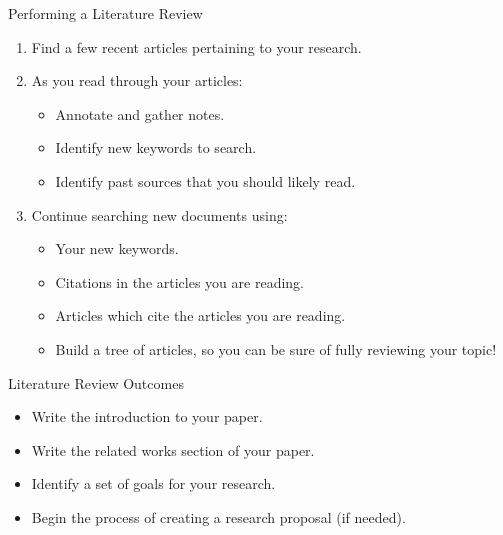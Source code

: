 \documentclass[handout]{beamer}
\begin{document}
\begin{frame}{Performing a Literature Review}
    \begin{enumerate}
        \item Find a few recent articles pertaining to your research.
        \item As you read through your articles:
        \begin{itemize}
            \item Annotate and gather notes.
            \item Identify new keywords to search.
            \item Identify past sources that you should likely read.
        \end{itemize}
        \item Continue searching new documents using:
        \begin{itemize}
            \item Your new keywords.
            \item Citations in the articles you are reading.
            \item Articles which cite the articles you are reading.
            \item Build a tree of articles, so you can be sure of fully reviewing your topic!
        \end{itemize}
    \end{enumerate}
\end{frame}

\begin{frame}{Literature Review Outcomes}
    \begin{itemize}
        \item Write the introduction to your paper.
        \item Write the related works section of your paper.
        \item Identify a set of goals for your research.
        \item Begin the process of creating a research proposal (if needed).
    \end{itemize}
\end{frame}
\end{document}
